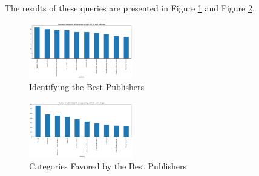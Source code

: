 \noindent
The results of these queries are presented in Figure \ref{fig:h6_which_best} and Figure \ref{fig:h6_where_best}.

\begin{figure}[H]
    \centering
    \includegraphics[width=0.4\textwidth]{./figures/h6_which_best.png}
    \caption{Identifying the Best Publishers}
    \label{fig:h6_which_best}
\end{figure}

\begin{figure}[H]
    \centering
    \includegraphics[width=0.4\textwidth]{./figures/h6_where_best.png}
    \caption{Categories Favored by the Best Publishers}
    \label{fig:h6_where_best}
\end{figure}
